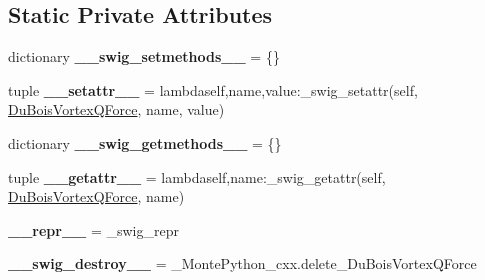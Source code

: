\subsection*{Static Private Attributes}
\begin{DoxyCompactItemize}
\item 
\hypertarget{classMontePython__cxx_1_1DuBoisVortexQForce_ae7faa9f365cfa6fd9eddae86607a70f6}{}dictionary {\bfseries \+\_\+\+\_\+swig\+\_\+setmethods\+\_\+\+\_\+} = \{\}\label{classMontePython__cxx_1_1DuBoisVortexQForce_ae7faa9f365cfa6fd9eddae86607a70f6}

\item 
\hypertarget{classMontePython__cxx_1_1DuBoisVortexQForce_a838f4ae717c2932de827e303b27a1a18}{}tuple {\bfseries \+\_\+\+\_\+setattr\+\_\+\+\_\+} = lambdaself,name,value\+:\+\_\+swig\+\_\+setattr(self, \hyperlink{classMontePython__cxx_1_1DuBoisVortexQForce}{Du\+Bois\+Vortex\+Q\+Force}, name, value)\label{classMontePython__cxx_1_1DuBoisVortexQForce_a838f4ae717c2932de827e303b27a1a18}

\item 
\hypertarget{classMontePython__cxx_1_1DuBoisVortexQForce_a07d2c7eecf7fdddb58ed8ef3e2fe6a3d}{}dictionary {\bfseries \+\_\+\+\_\+swig\+\_\+getmethods\+\_\+\+\_\+} = \{\}\label{classMontePython__cxx_1_1DuBoisVortexQForce_a07d2c7eecf7fdddb58ed8ef3e2fe6a3d}

\item 
\hypertarget{classMontePython__cxx_1_1DuBoisVortexQForce_a7af95eb93c798a54077252e045d1a808}{}tuple {\bfseries \+\_\+\+\_\+getattr\+\_\+\+\_\+} = lambdaself,name\+:\+\_\+swig\+\_\+getattr(self, \hyperlink{classMontePython__cxx_1_1DuBoisVortexQForce}{Du\+Bois\+Vortex\+Q\+Force}, name)\label{classMontePython__cxx_1_1DuBoisVortexQForce_a7af95eb93c798a54077252e045d1a808}

\item 
\hypertarget{classMontePython__cxx_1_1DuBoisVortexQForce_ad3a2cf6785e0cb60f3a74c7beafe6a63}{}{\bfseries \+\_\+\+\_\+repr\+\_\+\+\_\+} = \+\_\+swig\+\_\+repr\label{classMontePython__cxx_1_1DuBoisVortexQForce_ad3a2cf6785e0cb60f3a74c7beafe6a63}

\item 
\hypertarget{classMontePython__cxx_1_1DuBoisVortexQForce_a4b5536845ffb35a2d5e5b1d1b5ec1925}{}{\bfseries \+\_\+\+\_\+swig\+\_\+destroy\+\_\+\+\_\+} = \+\_\+\+Monte\+Python\+\_\+cxx.\+delete\+\_\+\+Du\+Bois\+Vortex\+Q\+Force\label{classMontePython__cxx_1_1DuBoisVortexQForce_a4b5536845ffb35a2d5e5b1d1b5ec1925}

\end{DoxyCompactItemize}


